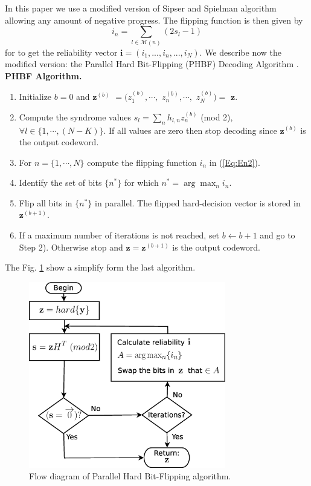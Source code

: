 \documentclass[journal]{IEEEtran}
\newenvironment{algorithm}[1][Algorithm]{\textbf{#1.} }{}
\begin{document}
In this paper we use a modified version of Sipser and Spielman algorithm allowing any amount of negative
progress. The flipping function is then given by
\begin{equation}\label{Eq:En2}
i_{n}=\sum_{l\in \mathcal{M}(n)} (2 s_{l} - 1)
\end{equation}
for to get the reliability vector $\mathbf{i}=({i}_1, ..., {i}_n, ..., {i}_N)$.
We describe now the modified version: the
Parallel Hard Bit-Flipping (PHBF) Decoding Algorithm \cite{tese}.\\

\begin{algorithm}[PHBF Algorithm]

\begin{enumerate}
\item Initialize $b=0$ and $\mathbf{z}^{(b)}$ $=(z^{(b)}_1, \cdots,$ $z^{(b)}_n, \cdots,$ $z^{(b)}_N)=$ $\mathbf{z}$.

\item Compute the syndrome values $s_{l}=\sum_{n} h_{l,n} z^{(b)}_{n}$ (mod 2), $\forall l \in \{1,\cdots, (N-K)\}$.
If all values are zero then stop decoding since $\mathbf{z}^{(b)}$
is the output codeword.

\item  For $n=\{1,\cdots, N\}$ compute the flipping function $i_{n}$ in (\ref{Eq:En2}).

\item Identify the set of bits $\{ n^{*} \}$
for which $n^{*}=\arg \max_{n} i_{n}$.

\item  Flip  all bits in $\{n^{*} \}$ in parallel. The flipped hard-decision vector is stored in
$\mathbf{z}^{(b+1)}$.

\item If a maximum number of iterations is not reached, set $b \leftarrow b+1$ and go to Step 2).
 Otherwise stop and $\mathbf{z}=\mathbf{z}^{(b+1)}$ is the output codeword.
\end{enumerate}
\end{algorithm}
The Fig. \ref{fig:flowphbf} show a simplify form the last algorithm.
\begin{figure}[!bt]
\centering
\includegraphics[width=8.6cm]{fig21.eps}
\caption{Flow diagram of Parallel Hard Bit-Flipping algorithm.} \label{fig:flowphbf}
\end{figure}
\end{document}
